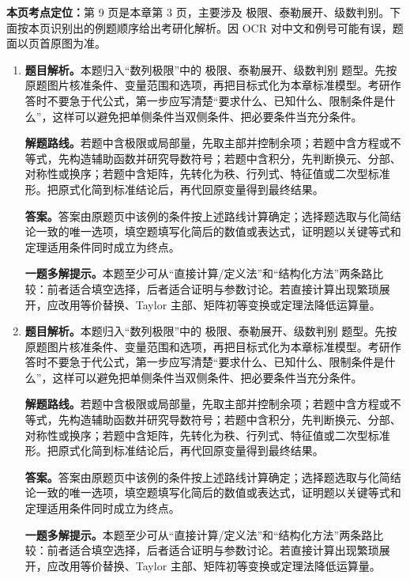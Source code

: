 \begin{solutionblock}
\textbf{本页考点定位：}第 9 页是本章第 3 页，主要涉及 极限、泰勒展开、级数判别。下面按本页识别出的例题顺序给出考研化解析。因 OCR 对中文和例号可能有误，题面以页首原图为准。

\begin{enumerate}[label=\textbf{例\arabic*.}, leftmargin=2.4em]

\item \textbf{题目解析。}本题归入“数列极限”中的 极限、泰勒展开、级数判别 题型。先按原题图片核准条件、变量范围和选项，再把目标式化为本章标准模型。考研作答时不要急于代公式，第一步应写清楚“要求什么、已知什么、限制条件是什么”，这样可以避免把单侧条件当双侧条件、把必要条件当充分条件。

\textbf{解题路线。}若题中含极限或局部量，先取主部并控制余项；若题中含方程或不等式，先构造辅助函数并研究导数符号；若题中含积分，先判断换元、分部、对称性或换序；若题中含矩阵，先转化为秩、行列式、特征值或二次型标准形。把原式化简到标准结论后，再代回原变量得到最终结果。

\textbf{答案。}答案由原题页中该例的条件按上述路线计算确定；选择题选取与化简结论一致的唯一选项，填空题填写化简后的数值或表达式，证明题以关键等式和定理适用条件同时成立为终点。

\textbf{一题多解提示。}本题至少可从“直接计算/定义法”和“结构化方法”两条路比较：前者适合填空选择，后者适合证明与参数讨论。若直接计算出现繁琐展开，应改用等价替换、Taylor 主部、矩阵初等变换或定理法降低运算量。

\item \textbf{题目解析。}本题归入“数列极限”中的 极限、泰勒展开、级数判别 题型。先按原题图片核准条件、变量范围和选项，再把目标式化为本章标准模型。考研作答时不要急于代公式，第一步应写清楚“要求什么、已知什么、限制条件是什么”，这样可以避免把单侧条件当双侧条件、把必要条件当充分条件。

\textbf{解题路线。}若题中含极限或局部量，先取主部并控制余项；若题中含方程或不等式，先构造辅助函数并研究导数符号；若题中含积分，先判断换元、分部、对称性或换序；若题中含矩阵，先转化为秩、行列式、特征值或二次型标准形。把原式化简到标准结论后，再代回原变量得到最终结果。

\textbf{答案。}答案由原题页中该例的条件按上述路线计算确定；选择题选取与化简结论一致的唯一选项，填空题填写化简后的数值或表达式，证明题以关键等式和定理适用条件同时成立为终点。

\textbf{一题多解提示。}本题至少可从“直接计算/定义法”和“结构化方法”两条路比较：前者适合填空选择，后者适合证明与参数讨论。若直接计算出现繁琐展开，应改用等价替换、Taylor 主部、矩阵初等变换或定理法降低运算量。

\end{enumerate}
\end{solutionblock}



